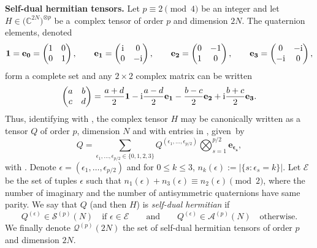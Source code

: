 \documentclass[pdftex]{sigma}
\newcommand{\AND}{\qquad \mathrm{and} \qquad}
\numberwithin{equation}{section}
\theoremstyle{definition}
\begin{document}
{\bf Self-dual hermitian tensors.}
Let $p \equiv 2 \pmod 4$ be an integer and let $H \in \bigl(\mathbb{C}^{2N}\bigr)^{\otimes p}$ be a~complex tensor of order $p$ and dimension $2N$. The quaternion elements, denoted
\begin{gather*}
 \mathbf{1}=\mathbf{e_0}=\begin{pmatrix} 1 & 0 \\ 0 & 1 \end{pmatrix},\qquad
 \mathbf{e_1}=\begin{pmatrix} {\rm i} & 0 \\ 0 & -{\rm i} \end{pmatrix},\qquad
 \mathbf{e_2}=\begin{pmatrix} 0 & -1 \\ 1 & 0 \end{pmatrix}, \qquad
 \mathbf{e_3}=\begin{pmatrix} 0 & -{\rm i} \\ -{\rm i} & 0 \end{pmatrix},
 \end{gather*}
form a complete set and any $2 \times 2$ complex matrix can be written
\[ \begin{pmatrix} a & b \\ c & d \end{pmatrix}= \frac{a+d}{2}\mathbf{1} -{\rm i}\frac{a-d}{2} \mathbf{e_1} - \frac{b-c}{2}\mathbf{e_2} + {\rm i}\frac{b+c}{2}\mathbf{e_3}.\]
Thus, identifying  with , the complex tensor $H$ may be canonically written as a tensor $Q$ of order $p$, dimension $N$ and with entries in , given~by
\[ Q=\sum_{\epsilon_1,\dots,\epsilon_{p/2} \in \{ 0,1,2,3 \}} Q^{(\epsilon_1,\dots,\epsilon_{p/2})} \bigotimes_{s=1}^{p/2} \mathbf{e_{\epsilon_s}}, \]
with . Denote $\epsilon=(\epsilon_1,\dots,\epsilon_{p/2})$ and for $0\leq k\leq 3$, $n_k(\epsilon):=\vert \{ s\colon \epsilon_s =k \}\vert$. Let $\mathcal{E}$ be the set of tuples $\epsilon$ such that $n_1(\epsilon)+n_3(\epsilon) \equiv n_2(\epsilon) \pmod 2$, where the number of imaginary and the number of antisymmetric quaternions have same parity.
We say that $Q$ (and then $H$) is {\em self-dual hermitian} if
\[ Q^{(\epsilon)} \in \mathcal{S}^{(p)}(N) \quad \text{if } \epsilon \in \mathcal{E}  \AND Q^{(\epsilon)} \in \mathcal{A}^{(p)}(N) \quad \text{otherwise}.\]
We finally denote $\mathcal{Q}^{(p)}(2N)$ the set of self-dual hermitian tensors of order $p$ and dimension $2N$.
\end{document}
